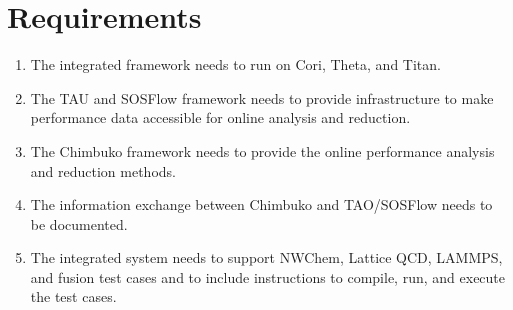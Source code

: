\section{Requirements}

\begin{enumerate}[label=R-\arabic*)]
\item The integrated framework needs to run on Cori, Theta, and Titan.
\item The TAU and SOSFlow framework needs to provide infrastructure to make performance data accessible for online analysis and reduction.
\item The Chimbuko framework needs to provide the online performance analysis and reduction methods.
\item The information exchange between Chimbuko and TAO/SOSFlow needs to be documented.
\item The integrated system needs to support NWChem, Lattice QCD, LAMMPS, and fusion test cases and to include instructions to compile, run, and execute the test cases.
\end{enumerate}

